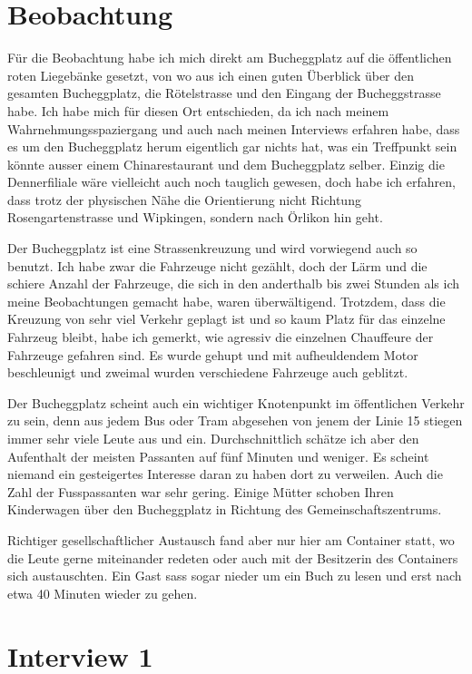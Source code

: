 \documentclass[a4paper,ngerman,11pt]{scrartcl}
\begin{document}
\section*{Beobachtung}
\label{sec-2}

Für die Beobachtung habe ich mich direkt am Bucheggplatz auf die öffentlichen
roten Liegebänke gesetzt, von wo aus ich einen guten Überblick über den
gesamten Bucheggplatz, die Rötelstrasse und den Eingang der Bucheggstrasse
habe. Ich habe mich für diesen Ort entschieden, da ich nach meinem
Wahrnehmungsspaziergang und auch nach meinen Interviews erfahren habe, dass es
um den Bucheggplatz herum eigentlich gar nichts hat, was ein Treffpunkt sein
könnte ausser einem Chinarestaurant und dem Bucheggplatz selber. Einzig die
Dennerfiliale wäre vielleicht auch noch tauglich gewesen, doch habe ich
erfahren, dass trotz der physischen Nähe die Orientierung nicht Richtung
Rosengartenstrasse und Wipkingen, sondern nach Örlikon hin geht.

Der Bucheggplatz ist eine Strassenkreuzung und wird vorwiegend auch so
benutzt. Ich habe zwar die Fahrzeuge nicht gezählt, doch der Lärm und die
schiere Anzahl der Fahrzeuge, die sich in den anderthalb bis zwei Stunden als
ich meine Beobachtungen gemacht habe, waren überwältigend. Trotzdem, dass die
Kreuzung von sehr viel Verkehr geplagt ist und so kaum Platz für das einzelne
Fahrzeug bleibt, habe ich gemerkt, wie agressiv die einzelnen Chauffeure der
Fahrzeuge gefahren sind. Es wurde gehupt und mit aufheuldendem Motor
beschleunigt und zweimal wurden verschiedene Fahrzeuge auch geblitzt.

Der Bucheggplatz scheint auch ein wichtiger Knotenpunkt im öffentlichen
Verkehr zu sein, denn aus jedem Bus oder Tram abgesehen von jenem der Linie 15
stiegen immer sehr viele Leute aus und ein. Durchschnittlich schätze ich aber
den Aufenthalt der meisten Passanten auf fünf Minuten und weniger. Es scheint
niemand ein gesteigertes Interesse daran zu haben dort zu verweilen. Auch die
Zahl der Fusspassanten war sehr gering. Einige Mütter schoben Ihren
Kinderwagen über den Bucheggplatz in Richtung des Gemeinschaftszentrums.

Richtiger gesellschaftlicher Austausch fand aber nur hier am Container statt,
wo die Leute gerne miteinander redeten oder auch mit der Besitzerin des
Containers sich austauschten. Ein Gast sass sogar nieder um ein Buch zu lesen
und erst nach etwa 40 Minuten wieder zu gehen.

\section*{Interview 1}
\label{sec-3}
\end{document}
